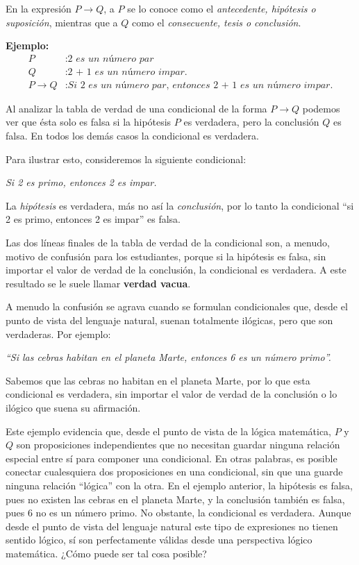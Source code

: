 En la expresión $P \rightarrow Q$, a $P$ se lo conoce como el \textit{antecedente, hipótesis o suposición}, mientras que a $Q$ como el \textit{consecuente, tesis o conclusión}. 

\textbf{Ejemplo:}
\begin{equation*}
    \begin{split}
        P &: \textit{2 es un número par} \\
        Q &: \textit{2 + 1 es un número impar.} \\
        P \rightarrow Q &: \textit{Si 2 es un número par, entonces 2 + 1 es un número impar.}
    \end{split}
    \label{eq:condicional-ej01}
\end{equation*}

Al analizar la tabla de verdad de una condicional de la forma $P \rightarrow Q$ podemos ver que ésta solo es falsa si la hipótesis $P$ es verdadera, pero la conclusión $Q$ es falsa. En todos los demás casos la condicional es verdadera.

Para ilustrar esto, consideremos la siguiente condicional:

\textit{Si 2 es primo, entonces 2 es impar.} 

La \textit{hipótesis} es verdadera, más no así la \textit{conclusión}, por lo tanto la condicional ``si 2 es primo, entonces 2 es impar'' es falsa.

Las dos líneas finales de la tabla de verdad de la condicional son, a menudo, motivo de confusión para los estudiantes, porque si la hipótesis es falsa, sin importar el valor de verdad de la conclusión, la condicional es verdadera. A este resultado se le suele llamar \textbf{verdad vacua}.

A menudo la confusión se agrava cuando se formulan condicionales que, desde el punto de vista del lenguaje natural, suenan totalmente ilógicas, pero que son verdaderas. Por ejemplo:

\textit{``Si las cebras habitan en el planeta Marte, entonces 6 es un número primo''.} 

Sabemos que las cebras no habitan en el planeta Marte, por lo que esta condicional es verdadera, sin importar el valor de verdad de la conclusión o lo ilógico que suena su afirmación. 

Este ejemplo evidencia que, desde el punto de vista de la lógica matemática, $P$ y $Q$ son proposiciones independientes que no necesitan guardar ninguna relación especial entre sí para componer una condicional. En otras palabras, es posible conectar cualesquiera dos proposiciones en una condicional, sin que una guarde ninguna relación ``lógica'' con la otra. En el ejemplo anterior, la hipótesis es falsa, pues no existen las cebras en el planeta Marte, y la conclusión también es falsa, pues 6 no es un número primo. No obstante, la condicional es verdadera. Aunque desde el punto de vista del lenguaje natural este tipo de expresiones no tienen sentido lógico, sí son perfectamente válidas desde una perspectiva lógico matemática. ¿Cómo puede ser tal cosa posible?

